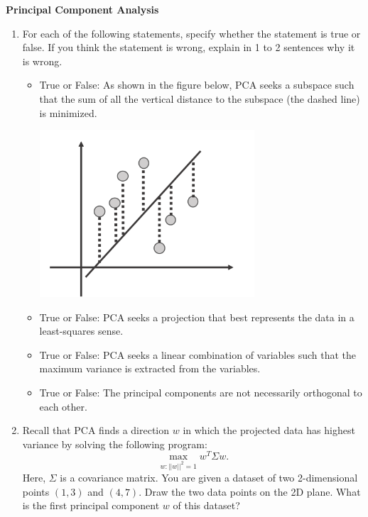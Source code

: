 \begin{Q}
\textbf{\Large Principal Component Analysis}\\

\begin{enumerate}

\item For each of the following statements, specify whether the statement is true or false. If you think the statement is wrong, explain in 1 to 2 sentences why it is wrong.


\begin{itemize}
\item True or False: As shown in the figure below, PCA seeks a subspace such that the sum of all the vertical distance to the subspace (the dashed line) is minimized.
\begin{center}
 \includegraphics[width=8cm]{figs/pca.pdf}
 \end{center}

\item True or False: PCA seeks a projection that best represents the data in a least-squares sense.

\item  True or False: PCA seeks a linear combination of variables such that the maximum variance is extracted from the variables. 

\item True or False: The principal components are not necessarily orthogonal to each other. \\

\end{itemize}


\item Recall that PCA finds a direction $w$ in which the projected data has highest variance by solving the following program:
	\begin{equation}
	\max_{w:||w||^2=1}w^T\Sigma w.
	\label{equ:pca}
	\end{equation}
	Here, $\Sigma$ is a covariance matrix. You are given a dataset of two 2-dimensional points $(1,3)$ and $(4,7)$. Draw the two data points on the 2D plane. What is the first principal component $w$ of this dataset?


\end{enumerate}
\end{Q}
